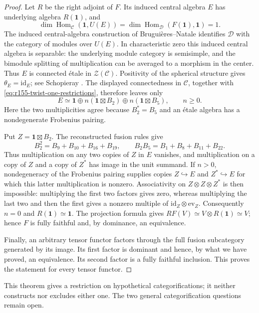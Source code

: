 \begin{proof}
Let $R$ be the right adjoint of $F$.
Its induced central algebra $E$ has underlying algebra $R(\mathbf1)$,
and
\[
 \dim\operatorname{Hom}_{\mathcal C}(\mathbf1,U(E))
 =\dim\operatorname{Hom}_{\mathcal D}(F(\mathbf1),\mathbf1)=1.
\]
The induced central-algebra construction of Brugui\`eres--Natale
\cite[Section~5]{BN} identifies $\mathcal D$ with the category of modules over $U(E)$.
In characteristic zero this induced central algebra is separable:
the underlying module category is semisimple, and the bimodule
splitting of multiplication can be averaged to a morphism in the
center. Thus $E$ is connected \'etale in $\mathcal Z(\mathcal C)$.
Positivity of the spherical structure gives $\theta_E=\mathrm{id}_E$;
see Schopieray \cite[Lemma~2.2.4]{SchLevelBounds}.
The displayed connectedness in $\mathcal C$, together with
\eqref{eq:r155-twist-one-restrictions}, therefore leaves only
\[
 E\simeq\mathbf1\oplus n(\mathbf1\boxtimes B_2)
                  \oplus n(\mathbf1\boxtimes B_5),\qquad n\geq0.
\]
Here the two multiplicities agree because $B_2^*=B_5$ and an \'etale
algebra has a nondegenerate Frobenius pairing.

Put $Z=\mathbf1\boxtimes B_2$. The reconstructed fusion rules give
\[
 B_2^2=B_9+B_{10}+B_{16}+B_{19},\qquad
 B_2B_5=B_1+B_8+B_{11}+B_{22}.
\]
Thus multiplication on any two copies of $Z$ in $E$ vanishes, and
multiplication on a copy of $Z$ and a copy of $Z^*$ has image in the
unit summand. If $n>0$, nondegeneracy of the Frobenius pairing supplies
copies $Z\hookrightarrow E$ and $Z^*\hookrightarrow E$ for which this
latter multiplication is nonzero. Associativity on
$Z\otimes Z\otimes Z^*$ is then impossible: multiplying the first
two factors gives zero, whereas multiplying the last two and then the
first gives a nonzero multiple of
$\mathrm{id}_Z\otimes\mathrm{ev}_Z$. Consequently $n=0$ and
$R(\mathbf1)\simeq\mathbf1$. The projection formula gives
$RF(V)\simeq V\otimes R(\mathbf1)\simeq V$; hence $F$ is fully
faithful and, by dominance, an equivalence.


Finally, an arbitrary tensor functor factors through the full fusion
subcategory generated by its image. Its first factor is dominant and
hence, by what we have proved, an equivalence. Its second factor is a
fully faithful inclusion. This proves the statement for every tensor
functor.
\end{proof}

This theorem gives a restriction on hypothetical categorifications;
it neither constructs nor excludes either one. The two general
categorification questions remain open.
